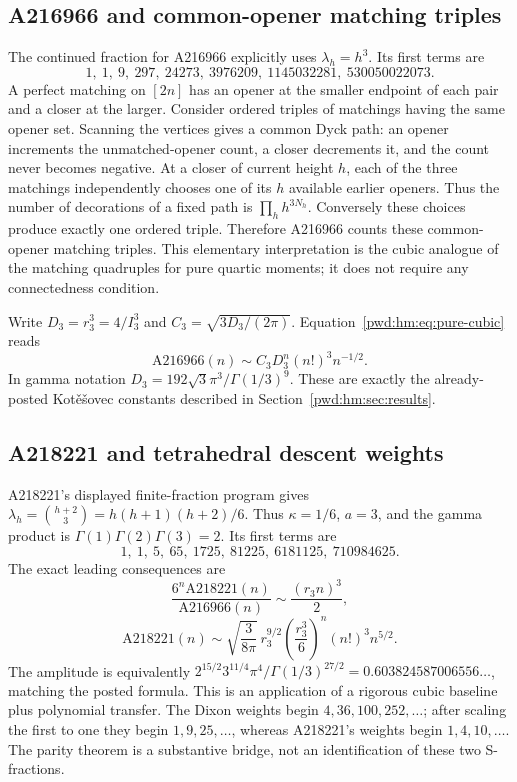 \documentclass[11pt,letterpaper]{article}
\numberwithin{equation}{section}
\theoremstyle{remark}\newtheorem{remark}[theorem]{Remark}
\begin{document}
\subsection{A216966 and common-opener matching triples}
The continued fraction for A216966 explicitly uses $\lambda_h=h^3$. Its first terms are
\[
 1,\ 1,\ 9,\ 297,\ 24273,\ 3976209,\ 1145032281,\ 530050022073.
\]
A perfect matching on $[2n]$ has an opener at the smaller endpoint of each pair and a closer at the larger. Consider ordered triples of matchings having the same opener set. Scanning the vertices gives a common Dyck path: an opener increments the unmatched-opener count, a closer decrements it, and the count never becomes negative. At a closer of current height $h$, each of the three matchings independently chooses one of its $h$ available earlier openers. Thus the number of decorations of a fixed path is $\prod_hh^{3N_h}$. Conversely these choices produce exactly one ordered triple. Therefore A216966 counts these common-opener matching triples. This elementary interpretation is the cubic analogue of the matching quadruples for pure quartic moments; it does not require any connectedness condition.

Write $D_3=r_3^3=4/I_3^3$ and $C_3=\sqrt{3D_3/(2\pi)}$. Equation~\eqref{pwd:hm:eq:pure-cubic} reads
\begin{equation}\label{pwd:hm:eq:A216966}
 \mathrm{A216966}(n)\sim C_3D_3^n(n!)^3n^{-1/2}.
\end{equation}
In gamma notation $D_3=192\sqrt3\pi^3/\Gamma(1/3)^9$. These are exactly the already-posted Kot\v e\v sovec constants described in Section~\ref{pwd:hm:sec:results}.

\subsection{A218221 and tetrahedral descent weights}
A218221's displayed finite-fraction program gives
$\lambda_h=\binom{h+2}{3}=h(h+1)(h+2)/6$. Thus $\kappa=1/6$, $a=3$, and the gamma product is $\Gamma(1)\Gamma(2)\Gamma(3)=2$. Its first terms are
\[
 1,\ 1,\ 5,\ 65,\ 1725,\ 81225,\ 6181125,\ 710984625.
\]
The exact leading consequences are
\begin{equation}\label{pwd:hm:eq:A218221-ratio}
 \frac{6^n\mathrm{A218221}(n)}{\mathrm{A216966}(n)}\sim\frac{(r_3n)^3}{2},
\end{equation}
\begin{equation}\label{pwd:hm:eq:A218221}
 \mathrm{A218221}(n)\sim
 \sqrt{\frac3{8\pi}}\,r_3^{9/2}
 \left(\frac{r_3^3}{6}\right)^n(n!)^3n^{5/2}.
\end{equation}
The amplitude is equivalently
$2^{15/2}3^{11/4}\pi^4/\Gamma(1/3)^{27/2}=0.603824587006556\ldots$, matching the posted formula. This is an application of a rigorous cubic baseline plus polynomial transfer. The Dixon weights begin $4,36,100,252,\ldots$; after scaling the first to one they begin $1,9,25,\ldots$, whereas A218221's weights begin $1,4,10,\ldots$. The parity theorem is a substantive bridge, not an identification of these two S-fractions.
\end{document}
